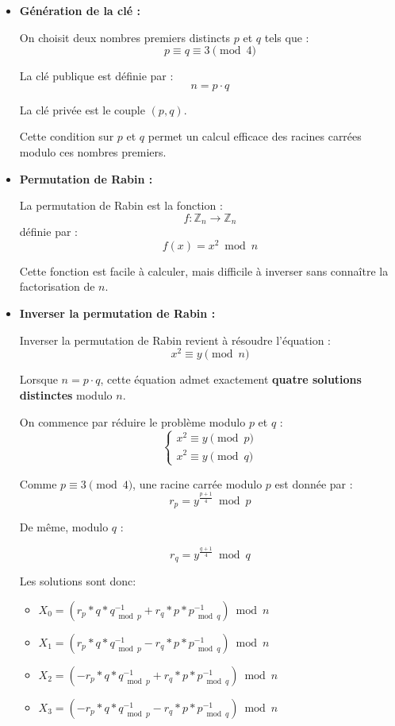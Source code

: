 \documentclass[9pt]{extarticle}
\begin{document}
\begin{itemize}
\item\textbf{Génération de la clé :}

On choisit deux nombres premiers distincts $p$ et $q$ tels que :
\[
p \equiv q \equiv 3 \pmod{4}
\]

La clé publique est définie par :
\[
n = p \cdot q
\]

La clé privée est le couple $(p, q)$.

Cette condition sur $p$ et $q$ permet un calcul efficace des racines carrées modulo ces nombres premiers.\\

\item\textbf{Permutation de Rabin :}

La permutation de Rabin est la fonction :
\[
f : \mathbb{Z}_n \rightarrow \mathbb{Z}_n
\]
définie par :
\[
f(x) = x^2 \bmod n
\]

Cette fonction est facile à calculer, mais difficile à inverser sans connaître la factorisation de $n$.\\

\item\textbf{Inverser la permutation de Rabin :}

Inverser la permutation de Rabin revient à résoudre l'équation :
\[
x^2 \equiv y \pmod{n}
\]

Lorsque $n = p \cdot q$, cette équation admet exactement \textbf{quatre solutions distinctes} modulo $n$.


On commence par réduire le problème modulo $p$ et $q$ :
\[
\begin{cases}
x^2 \equiv y \pmod{p} \\
x^2 \equiv y \pmod{q}
\end{cases}
\]

Comme $p \equiv 3 \pmod{4}$, une racine carrée modulo $p$ est donnée par :
\[
r_p = y^{\frac{p+1}{4}} \bmod p
\]

De même, modulo $q$ :

\[
r_q = y^{\frac{q+1}{4}} \bmod q
\]

Les solutions sont donc: 

\begin{itemize}
  \item $X_0 = (r_p * q * q^{-1}_{\bmod p} + r_q * p * p^{-1}_{\bmod q}) \bmod n $

  \item $X_1 = (r_p * q * q^{-1}_{\bmod p} - r_q * p * p^{-1}_{\bmod q}) \bmod n$

  \item $X_2 = (-r_p * q * q^{-1}_{\bmod p} + r_q * p * p^{-1}_{\bmod q}) \bmod n$

  \item $X_3 = (-r_p * q * q^{-1}_{\bmod p} - r_q * p * p^{-1}_{\bmod q}) \bmod n$
\end{itemize}


\end{itemize}
\end{document}
